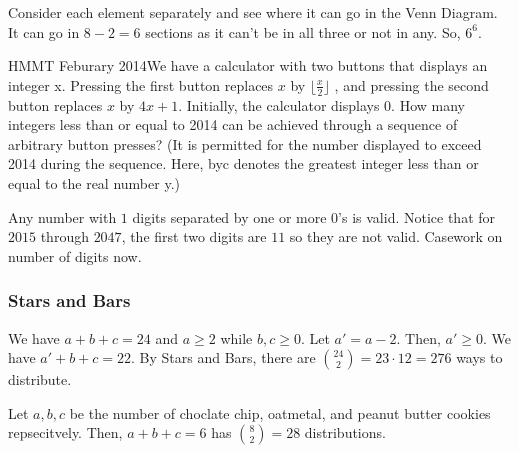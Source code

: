 \documentclass[11pt]{article}
\begin{document}
\begin{sol}
Consider each element separately and see where it can go in the Venn Diagram. It can go in $8-2=6$ sections as it can't be in all three or not in any. So, $\boxed{6^6}$.
\end{sol}

 {HMMT Feburary 2014}{We have a calculator with two buttons that displays an integer x. Pressing the first button replaces
$x$ by $\lfloor \frac{x}{2} \rfloor$ , and pressing the second button replaces $x$ by $4x + 1$. Initially, the calculator displays 0.
How many integers less than or equal to 2014 can be achieved through a sequence of arbitrary button
presses? (It is permitted for the number displayed to exceed 2014 during the sequence. Here, byc
denotes the greatest integer less than or equal to the real number y.)}

\begin{sol}
Any number with $1$ digits separated by one or more $0$'s  is valid. Notice that for $2015$ through $2047$, the first two digits are $11$ so they are not valid. Casework on number of digits now.
\end{sol}

\subsubsection{Stars and Bars}


\begin{sol}
We have $a+b+c=24$ and $a\ge 2$ while $b,c\ge 0$. Let $a'=a-2$. Then, $a'\ge 0$. We have $a'+b+c=22$. By Stars and Bars, there are $\binom{24}{2}=23\cdot 12=\boxed{276}$ ways to distribute.
\end{sol}


\begin{sol} 
Let $a,b,c$ be the number of choclate chip, oatmetal, and peanut butter cookies repsecitvely. Then, $a+b+c=6$ has $\binom{8}{2}=\boxed{28}$ distributions.
\end{sol}
\end{document}
